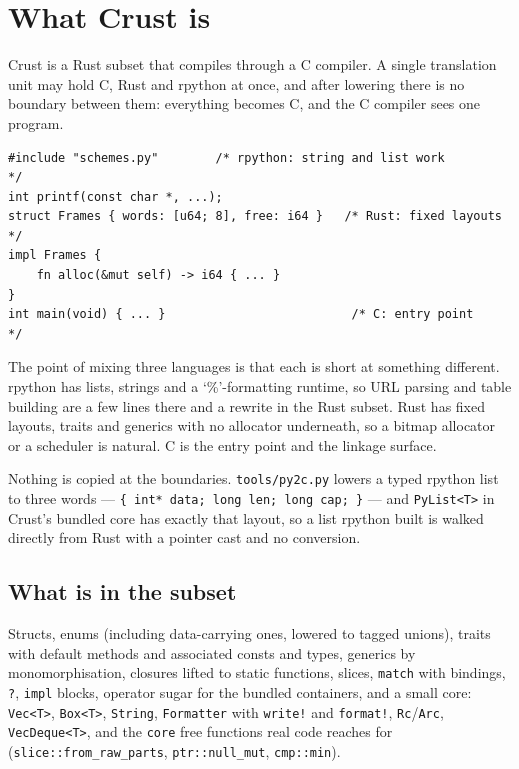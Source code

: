 \section{What Crust is}

Crust is a Rust subset that compiles through a C compiler. A single
translation unit may hold C, Rust and rpython at once, and after lowering
there is no boundary between them: everything becomes C, and the C compiler
sees one program.

\begin{verbatim}
#include "schemes.py"        /* rpython: string and list work         */
int printf(const char *, ...);
struct Frames { words: [u64; 8], free: i64 }   /* Rust: fixed layouts  */
impl Frames {
    fn alloc(&mut self) -> i64 { ... }
}
int main(void) { ... }                          /* C: entry point      */
\end{verbatim}

The point of mixing three languages is that each is short at something
different. rpython has lists, strings and a `\%'-formatting runtime, so URL
parsing and table building are a few lines there and a rewrite in the Rust
subset. Rust has fixed layouts, traits and generics with no allocator
underneath, so a bitmap allocator or a scheduler is natural. C is the entry
point and the linkage surface.

Nothing is copied at the boundaries. \texttt{tools/py2c.py} lowers a typed
rpython list to three words --- \texttt{\{ int* data; long len; long cap; \}}
--- and \texttt{PyList<T>} in Crust's bundled core has exactly that layout, so
a list rpython built is walked directly from Rust with a pointer cast and no
conversion.

\subsection{What is in the subset}

Structs, enums (including data-carrying ones, lowered to tagged unions),
traits with default methods and associated consts and types, generics by
monomorphisation, closures lifted to static functions, slices, \texttt{match}
with bindings, \texttt{?}, \texttt{impl} blocks, operator sugar for the
bundled containers, and a small core: \texttt{Vec<T>}, \texttt{Box<T>},
\texttt{String}, \texttt{Formatter} with \texttt{write!} and \texttt{format!},
\texttt{Rc}/\texttt{Arc}, \texttt{VecDeque<T>}, and the \texttt{core} free
functions real code reaches for (\texttt{slice::from\_raw\_parts},
\texttt{ptr::null\_mut}, \texttt{cmp::min}).

